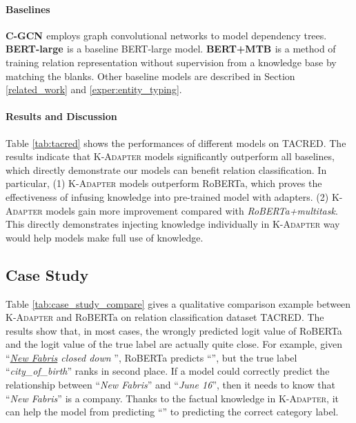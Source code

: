 \documentclass[11pt,a4paper]{article}
\begin{document}
\paragraph{Baselines}
\textbf{C-GCN \citep{zhang2018graph}} employs graph convolutional networks to model dependency trees. 
\textbf{BERT-large \citep{soares2019matching}} is a baseline BERT-large model. \textbf{BERT+MTB \citep{soares2019matching}} is a method of training relation representation without supervision from a knowledge base by matching the blanks.
Other baseline models are described in Section \ref{related_work} and \ref{exper:entity_typing}.

\paragraph{Results and Discussion} Table \ref{tab:tacred} shows the performances of different models on TACRED. The results indicate that \textsc{K-Adapter} models significantly outperform all baselines, which directly demonstrate our models can benefit relation classification. In particular, (1) \textsc{K-Adapter} models outperform RoBERTa, which proves the effectiveness of infusing knowledge into pre-trained model with adapters. (2) \textsc{K-Adapter} models gain more improvement compared with \emph{RoBERTa+multitask}. This directly demonstrates injecting knowledge individually in \textsc{K-Adapter} way would help models make full use of knowledge. 


\subsection{Case Study}
Table \ref{tab:case_study_compare} gives a qualitative comparison example between \textsc{K-Adapter} and RoBERTa on relation classification dataset TACRED. The results show that, in most cases, the wrongly predicted logit value of RoBERTa and the logit value of the true label are actually quite close. 
For example, given ``\textit{\underline{New Fabris} closed down }'', RoBERTa predicts ``'', but the true label ``\textit{city\_of\_birth}'' ranks in second place. If a model could correctly predict the relationship between ``\textit{New Fabris}'' and ``\textit{June 16}'', then it needs to know that ``\textit{New Fabris}'' is a company. Thanks to the factual knowledge in \textsc{K-Adapter}, it can help the model from predicting ``'' to predicting the correct category label.
\end{document}
